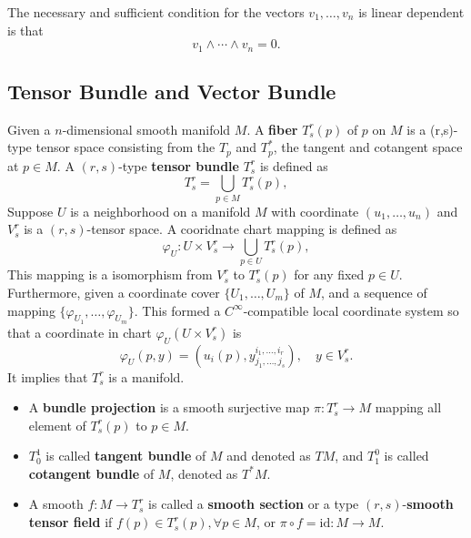 \begin{theorem}
The necessary and sufficient condition for the vectors $v_1,\dots,v_n$ is linear dependent is that
\begin{equation}
v_1\wedge\cdots\wedge v_n=0.
\end{equation}
\end{theorem}

\subsection{Tensor Bundle and Vector Bundle}
\begin{definition}
Given a $n$-dimensional smooth manifold $M$. A \textbf{fiber} $T^r_s(p)$ of $p$ on $M$ is a (r,s)-type tensor space consisting from the $T_p$ and $T^*_p$, the tangent and cotangent space at $p\in M$. A $(r,s)$-type \textbf{tensor bundle} $T^r_s$ is defined as
\begin{equation}
T^r_s=\bigcup_{p\in M}T^r_s(p),
\end{equation}
Suppose $U$ is a neighborhood on a manifold $M$ with coordinate $(u_1,\dots,u_n)$ and $V^r_s$ is a $(r,s)$-tensor space. A cooridnate chart mapping is defined as
\begin{equation}
\varphi_U:U\times V^r_s\to \bigcup_{p\in U}T^r_s(p),
\end{equation}
This mapping is a isomorphism from $V^r_s$ to $T^r_s(p)$ for any fixed $p\in U$. Furthermore, given a coordinate cover $\{U_1,\dots,U_m\}$ of $M$, and a sequence of mapping $\{\varphi_{U_1},\dots,\varphi_{U_m}\}$. This formed a $C^\infty$-compatible local coordinate system so that a coordinate in chart $\varphi_U(U\times V^r_s)$ is
\begin{equation}
\varphi_U(p,y)=\left(u_i(p),y^{i_1,\dots,i_r}_{j_1,\dots,j_s}\right),\quad y\in V^r_s.
\end{equation}
It implies that $T^r_s$ is a manifold. 
\begin{itemize}
\item A \textbf{bundle projection} is a smooth surjective map $\pi:T^r_s\to M$ mapping all element of $T^r_s(p)$ to $p\in M$.
\item $T^1_0$ is called \textbf{tangent bundle} of $M$ and denoted as $TM$, and $T_1^0$ is called \textbf{cotangent bundle} of $M$, denoted as $T^*M$.
\item A smooth $f:M\to T^r_s$ is called a \textbf{smooth section} or a type $(r,s)$-\textbf{smooth tensor field} if $f(p)\in T^r_s(p),\forall p\in M$, or $\pi\circ f=\text{id}:M\to M$.
\end{itemize}
\end{definition}


